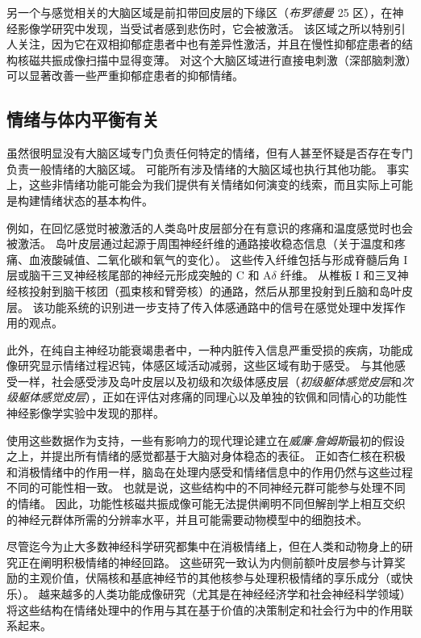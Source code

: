 另一个与感觉相关的大脑区域是前扣带回皮层的下缘区（\textit{布罗德曼} 25 区），在神经影像学研究中发现，当受试者感到悲伤时，它会被激活。
该区域之所以特别引人关注，因为它在双相抑郁症患者中也有差异性激活，并且在慢性抑郁症患者的结构核磁共振成像扫描中显得变薄。
对这个大脑区域进行直接电刺激（深部脑刺激）可以显著改善一些严重抑郁症患者的抑郁情绪。



\subsection{情绪与体内平衡有关}

虽然很明显没有大脑区域专门负责任何特定的情绪，但有人甚至怀疑是否存在专门负责一般情绪的大脑区域。
可能所有涉及情绪的大脑区域也执行其他功能。
事实上，这些非情绪功能可能会为我们提供有关情绪如何演变的线索，而且实际上可能是构建情绪状态的基本构件。


例如，在回忆感觉时被激活的人类岛叶皮层部分在有意识的疼痛和温度感觉时也会被激活。
岛叶皮层通过起源于周围神经纤维的通路接收稳态信息（关于温度和疼痛、血液酸碱值、二氧化碳和氧气的变化）。
这些传入纤维包括与形成脊髓后角 I 层或脑干三叉神经核尾部的神经元形成突触的 C 和 A$ \delta $ 纤维。
从椎板 I 和三叉神经核投射到脑干核团（孤束核和臂旁核）的通路，然后从那里投射到丘脑和岛叶皮层。
该功能系统的识别进一步支持了传入体感通路中的信号在感觉处理中发挥作用的观点。


此外，在纯自主神经功能衰竭患者中，一种内脏传入信息严重受损的疾病，功能成像研究显示情绪过程迟钝，体感区域活动减弱，这些区域有助于感受。
与其他感受一样，社会感受涉及岛叶皮层以及初级和次级体感皮层（\textit{初级躯体感觉皮层}和\textit{次级躯体感觉皮层}），正如在评估对疼痛的同理心以及单独的钦佩和同情心的功能性神经影像学实验中发现的那样。


使用这些数据作为支持，一些有影响力的现代理论建立在\textit{威廉$\cdot$詹姆斯}最初的假设之上，并提出所有情绪的感觉都基于大脑对身体稳态的表征。
正如杏仁核在积极和消极情绪中的作用一样，脑岛在处理内感受和情绪信息中的作用仍然与这些过程不同的可能性相一致。
也就是说，这些结构中的不同神经元群可能参与处理不同的情绪。
因此，功能性核磁共振成像可能无法提供阐明不同但解剖学上相互交织的神经元群体所需的分辨率水平，并且可能需要动物模型中的细胞技术。


尽管迄今为止大多数神经科学研究都集中在消极情绪上，但在人类和动物身上的研究正在阐明积极情绪的神经回路。
这些研究一致认为内侧前额叶皮层参与计算奖励的主观价值，伏隔核和基底神经节的其他核参与处理积极情绪的享乐成分（或快乐）。
越来越多的人类功能成像研究（尤其是在神经经济学和社会神经科学领域）将这些结构在情绪处理中的作用与其在基于价值的决策制定和社会行为中的作用联系起来。




